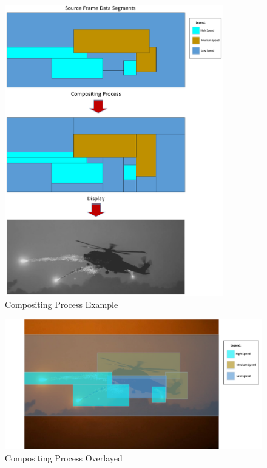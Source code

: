 \begin{figure}
        \centering
        \includegraphics[width=0.85\textwidth]{fig/compositing.pdf}
        \caption{Compositing Process Example}
        \label{fig:compositing}
\end{figure}

\begin{figure}
        \centering
        \includegraphics[width=1.0\textwidth]{fig/compositing_combined.pdf}
        \caption{Compositing Process Overlayed}
        \label{fig:compositing_overlayed}
\end{figure}

